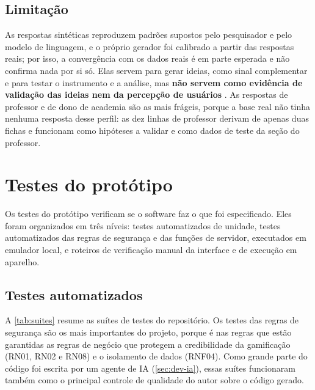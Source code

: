 \subsection{Limitação}

As respostas sintéticas reproduzem padrões supostos pelo pesquisador e
pelo modelo de linguagem, e o próprio gerador foi calibrado a partir das
respostas reais; por isso, a convergência com os dados reais é em parte
esperada e não confirma nada por si só. Elas servem para gerar ideias,
como sinal complementar e para testar o instrumento e a análise, mas
\textbf{não servem como evidência de validação das ideias nem da
percepção de usuários} \cite{argyle2023,aher2023,wang2025}. As respostas de professor e de dono de
academia são as mais frágeis, porque a base real não tinha nenhuma
resposta desse perfil: as dez linhas de professor derivam de apenas duas
fichas e funcionam como hipóteses a validar e como dados de teste da
seção do professor.

\section{Testes do protótipo}
\label{sec:testes-prototipo}

Os testes do protótipo verificam se o software faz o que foi
especificado. Eles foram organizados em três níveis: testes automatizados
de unidade, testes automatizados das regras de segurança e das funções
de servidor, executados em emulador local, e roteiros de verificação
manual da interface e de execução em aparelho.

\subsection{Testes automatizados}

A \autoref{tab:suites} resume as suítes de testes do repositório. Os
testes das regras de segurança são os mais importantes do projeto,
porque é nas regras que estão garantidas as regras de negócio que
protegem a credibilidade da gamificação (RN01, RN02 e RN08) e o
isolamento de dados (RNF04). Como grande parte do código foi escrita por
um agente de IA (\autoref{sec:dev-ia}), essas suítes funcionaram também
como o principal controle de qualidade do autor sobre o código gerado.

